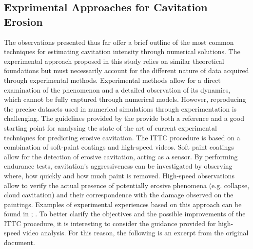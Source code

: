 \subsection{Exprimental Approaches for Cavitation Erosion}

The observations presented thus far offer a brief outline of the most common techniques for estimating cavitation intensity through numerical solutions. The experimental approach proposed in this study relies on similar theoretical foundations but must necessarily account for the different nature of data acquired through experimental methods.
Experimental methods allow for a direct examination of the phenomenon and a detailed observation of its dynamics, which cannot be fully captured through numerical models. However, reproducing the precise datasets used in numerical simulations through experimentation is challenging.
The guidelines provided by the \cite{ITTC_Erosion} provide both a reference and a good starting point for analysing the state of the art of current experimental techniques for predicting erosive cavitation.
The ITTC procedure is based on a combination of soft-paint coatings and high-speed videos.
Soft paint coatings allow for the detection of erosive cavitation, acting as a sensor.  By performing endurance tests, cavitation's aggressiveness can be investigated by observing where, how quickly and how much paint is removed.
High-speed observations allow to verify the actual presence of potentially erosive phenomena (e.g. collapse, cloud cavitation) and their correspondence with the damage observed on the paintings. 
Examples of experimental experiences based on this approach can be found in \cite{Mantzaris2015}; \cite{Pfitsch2009}.
To better clarify the objectives and the possible improvements of the ITTC procedure, it is interesting to consider the guidance provided for high-speed video analysis. For this reason, the following is an excerpt from the original document.

